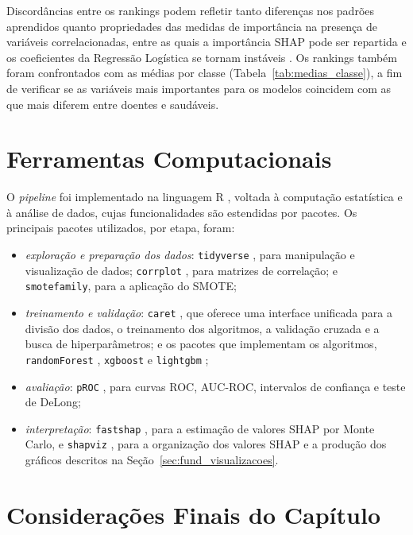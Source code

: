 Discordâncias entre os rankings podem refletir tanto diferenças nos padrões aprendidos quanto propriedades das medidas de importância na presença de variáveis correlacionadas, entre as quais a importância SHAP pode ser repartida \cite{Chen2023Algorithms} e os coeficientes da Regressão Logística se tornam instáveis \cite{Dormann2013Collinearity}. Os rankings também foram confrontados com as médias por classe (Tabela~\ref{tab:medias_classe}), a fim de verificar se as variáveis mais importantes para os modelos coincidem com as que mais diferem entre doentes e saudáveis.

\section{Ferramentas Computacionais}
\label{sec:ferramentas}\label{sec:fund_ferramentas}

O \textit{pipeline} foi implementado na linguagem R \cite{linguagemr}, voltada à computação estatística e à análise de dados, cujas funcionalidades são estendidas por pacotes. Os principais pacotes utilizados, por etapa, foram:

\begin{itemize}
    \item \textit{exploração e preparação dos dados}: \texttt{tidyverse} \cite{tidyverse}, para manipulação e visualização de dados; \texttt{corrplot} \cite{corrplot2024}, para matrizes de correlação; e \texttt{smotefamily}, para a aplicação do SMOTE;
    \item \textit{treinamento e validação}: \texttt{caret} \cite{Kuhn2008Building}, que oferece uma interface unificada para a divisão dos dados, o treinamento dos algoritmos, a validação cruzada e a busca de hiperparâmetros; e os pacotes que implementam os algoritmos, \texttt{randomForest} \cite{Liaw2002Classification}, \texttt{xgboost} \cite{Chen2016XGBoost} e \texttt{lightgbm} \cite{Ke2017LightGBM};
    \item \textit{avaliação}: \texttt{pROC} \cite{Robin2011pROC}, para curvas ROC, AUC-ROC, intervalos de confiança e teste de DeLong;
    \item \textit{interpretação}: \texttt{fastshap} \cite{Greenwell2024fastshap}, para a estimação de valores SHAP por Monte Carlo, e \texttt{shapviz} \cite{Mayer2026shapviz}, para a organização dos valores SHAP e a produção dos gráficos descritos na Seção~\ref{sec:fund_visualizacoes}.
\end{itemize}

\section{Considerações Finais do Capítulo}
\label{sec:met_consideracoes}

